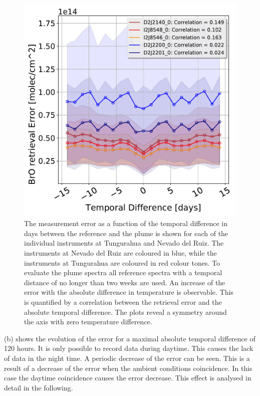 \\
\begin{figure}
	\centering
	\includegraphics[width=0.7\linewidth]{Bilder/DatallInstruments}
	\caption[The  measurement error as a function of the temporal difference in days between the reference and the plume is shown for each of the individual instruments at Tungurahua and Nevado del Ruiz. ]{The  measurement error as a function of the temporal difference in days between the reference and the plume is shown for each of the individual instruments at Tungurahua and Nevado del Ruiz. The instruments at Nevado del Ruiz are coloured in blue, while the instruments at Tungurahua are coloured in red colour tones.  To evaluate the plume spectra all reference spectra with a temporal distance of no longer than two weeks are used. An increase of the  error with the absolute difference in temperature is observable. This is quantified by a correlation between the  retrieval error and the absolute temporal difference. The plots reveal a symmetry around the axis with zero temperature difference.}
	\label{fig:datallinstruments}
\end{figure}
%
 (b) shows the evolution of the  error for a maximal absolute temporal difference of 120 hours. It is only possible to record data during daytime. This causes the lack of data in the night time. A periodic decrease of the  error can be seen. This is a result of a decrease of the  error when the ambient conditions coincidence. In this case the daytime coincidence causes the   error decrease. This effect is analysed in detail in the following.


